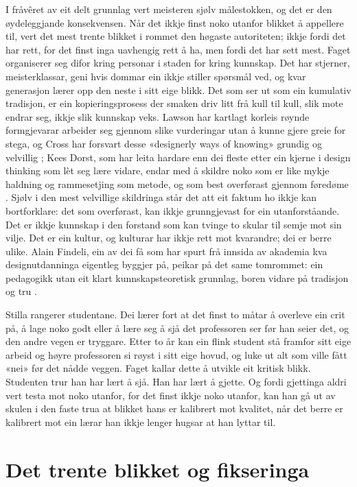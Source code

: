 I fråvêret av eit delt grunnlag vert meisteren sjølv målestokken, og det er den øydeleggjande konsekvensen. Når det ikkje finst noko utanfor blikket å appellere til, vert det mest trente blikket i rommet den høgaste autoriteten; ikkje fordi det har rett, for det finst inga uavhengig rett å ha, men fordi det har sett mest. Faget organiserer seg difor kring personar i staden for kring kunnskap. Det har stjerner, meisterklassar, geni hvis dommar ein ikkje stiller spørsmål ved, og kvar generasjon lærer opp den neste i sitt eige blikk. Det som ser ut som ein kumulativ tradisjon, er ein kopieringsprosess der smaken driv litt frå kull til kull, slik mote endrar seg, ikkje slik kunnskap veks. Lawson har kartlagt korleis røynde formgjevarar arbeider seg gjennom slike vurderingar utan å kunne gjere greie for stega, og Cross har forsvart desse «designerly ways of knowing» grundig og velvillig \autocite{lawson1980,cross1982,cross2006}; Kees Dorst, som har leita hardare enn dei fleste etter ein kjerne i design thinking som lèt seg lære vidare, endar med å skildre noko som er like mykje haldning og rammesetjing som metode, og som best overførast gjennom føredøme \autocite{dorst2011core}. Sjølv i den mest velvillige skildringa står det att eit faktum ho ikkje kan bortforklare: det som overførast, kan ikkje grunngjevast for ein utanforståande. Det er ikkje kunnskap i den forstand som kan tvinge to skular til semje mot sin vilje. Det er ein kultur, og kulturar har ikkje rett mot kvarandre; dei er berre ulike. Alain Findeli, ein av dei få som har spurt frå innsida av akademia kva designutdanninga eigentleg byggjer på, peikar på det same tomrommet: ein pedagogikk utan eit klart kunnskapsteoretisk grunnlag, boren vidare på tradisjon og tru \autocite{findeli2001}.

Stilla rangerer studentane. Dei lærer fort at det finst to måtar å overleve ein crit på, å lage noko godt eller å lære seg å sjå det professoren ser før han seier det, og den andre vegen er tryggare. Etter to år kan ein flink student stå framfor sitt eige arbeid og høyre professoren si røyst i sitt eige hovud, og luke ut alt som ville fått «nei» før det nådde veggen. Faget kallar dette å utvikle eit kritisk blikk. Studenten trur han har lært å sjå. Han har lært å gjette. Og fordi gjettinga aldri vert testa mot noko utanfor, for det finst ikkje noko utanfor, kan han gå ut av skulen i den faste trua at blikket hans er kalibrert mot kvalitet, når det berre er kalibrert mot ein lærar han ikkje lenger hugsar at han lyttar til.

\section{Det trente blikket og fikseringa}

